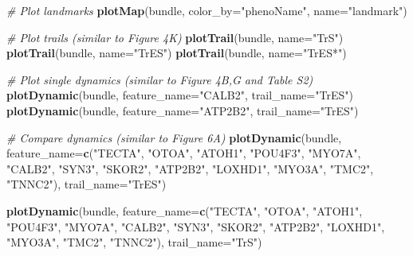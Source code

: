 \documentclass[]{book}
\newenvironment{Shaded}{\begin{snugshade}}{\end{snugshade}}
\newcommand{\KeywordTok}[1]{\textcolor[rgb]{0.13,0.29,0.53}{\textbf{#1}}}
\newcommand{\DataTypeTok}[1]{\textcolor[rgb]{0.13,0.29,0.53}{#1}}
\newcommand{\StringTok}[1]{\textcolor[rgb]{0.31,0.60,0.02}{#1}}
\newcommand{\CommentTok}[1]{\textcolor[rgb]{0.56,0.35,0.01}{\textit{#1}}}
\newcommand{\NormalTok}[1]{#1}
\theoremstyle{definition}
\theoremstyle{definition}
\theoremstyle{definition}
\theoremstyle{remark}
\begin{document}
\begin{Shaded}
\begin{Highlighting}[]
\CommentTok{# Plot landmarks}
\KeywordTok{plotMap}\NormalTok{(bundle, }\DataTypeTok{color_by=}\StringTok{"phenoName"}\NormalTok{, }\DataTypeTok{name=}\StringTok{"landmark"}\NormalTok{)}

\CommentTok{# Plot trails (similar to Figure 4K)}
\KeywordTok{plotTrail}\NormalTok{(bundle, }\DataTypeTok{name=}\StringTok{"TrS"}\NormalTok{)}
\KeywordTok{plotTrail}\NormalTok{(bundle, }\DataTypeTok{name=}\StringTok{"TrES"}\NormalTok{)}
\KeywordTok{plotTrail}\NormalTok{(bundle, }\DataTypeTok{name=}\StringTok{"TrES*"}\NormalTok{)}

\CommentTok{# Plot single dynamics (similar to Figure 4B,G and Table S2)}
\KeywordTok{plotDynamic}\NormalTok{(bundle, }\DataTypeTok{feature_name=}\StringTok{"CALB2"}\NormalTok{, }\DataTypeTok{trail_name=}\StringTok{"TrES"}\NormalTok{)}
\KeywordTok{plotDynamic}\NormalTok{(bundle, }\DataTypeTok{feature_name=}\StringTok{"ATP2B2"}\NormalTok{, }\DataTypeTok{trail_name=}\StringTok{"TrES"}\NormalTok{)}

\CommentTok{# Compare dynamics (similar to Figure 6A)}
\KeywordTok{plotDynamic}\NormalTok{(bundle, }
            \DataTypeTok{feature_name=}\KeywordTok{c}\NormalTok{(}\StringTok{"TECTA"}\NormalTok{, }\StringTok{"OTOA"}\NormalTok{, }\StringTok{"ATOH1"}\NormalTok{, }\StringTok{"POU4F3"}\NormalTok{, }
                           \StringTok{"MYO7A"}\NormalTok{, }\StringTok{"CALB2"}\NormalTok{, }\StringTok{"SYN3"}\NormalTok{, }\StringTok{"SKOR2"}\NormalTok{,}
                           \StringTok{"ATP2B2"}\NormalTok{, }\StringTok{"LOXHD1"}\NormalTok{, }\StringTok{"MYO3A"}\NormalTok{, }\StringTok{"TMC2"}\NormalTok{, }
                           \StringTok{"TNNC2"}\NormalTok{), }\DataTypeTok{trail_name=}\StringTok{"TrES"}\NormalTok{)}

\KeywordTok{plotDynamic}\NormalTok{(bundle, }
            \DataTypeTok{feature_name=}\KeywordTok{c}\NormalTok{(}\StringTok{"TECTA"}\NormalTok{, }\StringTok{"OTOA"}\NormalTok{, }\StringTok{"ATOH1"}\NormalTok{, }\StringTok{"POU4F3"}\NormalTok{, }
                           \StringTok{"MYO7A"}\NormalTok{, }\StringTok{"CALB2"}\NormalTok{, }\StringTok{"SYN3"}\NormalTok{, }\StringTok{"SKOR2"}\NormalTok{,}
                           \StringTok{"ATP2B2"}\NormalTok{, }\StringTok{"LOXHD1"}\NormalTok{, }\StringTok{"MYO3A"}\NormalTok{, }\StringTok{"TMC2"}\NormalTok{, }
                           \StringTok{"TNNC2"}\NormalTok{), }\DataTypeTok{trail_name=}\StringTok{"TrS"}\NormalTok{)}
\end{Highlighting}
\end{Shaded}
\end{document}
